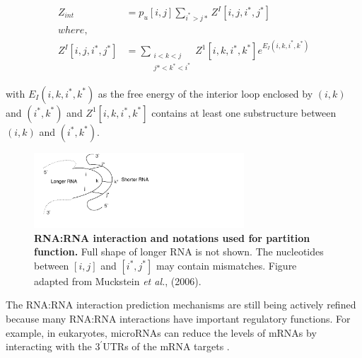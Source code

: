 \begin{equation}
\begin{aligned}
    Z_{int} &= p_u[i,j] \sum_{i^*>j*} Z^I[i,j,i^*,j^*] \\
    where, \\
    Z^I[i,j,i^*,j^*] &= \sum_{\substack{i<k<j\\
    j*<k^*<i^*}} Z^1[i,k,i^*,k^*] e^{E_I(i,k,i^*,k^*)}
\end{aligned}
\end{equation}

with $E_I(i,k,i^*,k^*)$ as the free energy of the interior loop enclosed by $(i,k)$ and $(i^*,k^*)$ and $Z^1[i,k,i^*,k^*]$ contains at least one substructure between $(i,k)$ and $(i^*,k^*)$. 

\begin{figure}
  \begin{center}
\includegraphics[width=0.7\textwidth]{chapters/Introduction/Figures/interac.pdf}
\caption[RNA:RNA interaction and notations used for partition function.]{\textbf{RNA:RNA interaction and notations used for partition function.} Full shape of longer RNA is not shown. The nucleotides between $[i,j]$ and $[i^*,j^*]$ may contain mismatches. Figure adapted from Muckstein \textit{et al.}, (2006). }%
\label{fig:part_fun_interac}
  \end{center}
\end{figure}

The RNA:RNA interaction prediction mechanisms are still being actively refined because many RNA:RNA interactions have important regulatory functions. For example, in eukaryotes, microRNAs can reduce the levels of mRNAs by interacting with the $3^{\prime}$UTRs of the mRNA targets \cite{catalanotto2016microrna, valencia2006control}.




